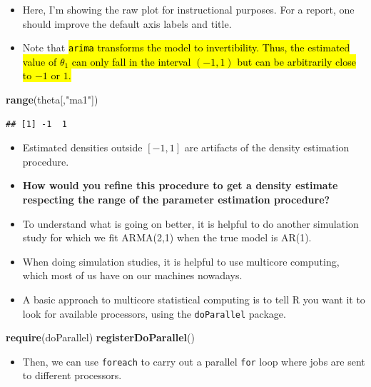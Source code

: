 \documentclass[]{article}
\newenvironment{Shaded}{\begin{snugshade}}{\end{snugshade}}
\newcommand{\KeywordTok}[1]{\textcolor[rgb]{0.13,0.29,0.53}{\textbf{#1}}}
\newcommand{\StringTok}[1]{\textcolor[rgb]{0.31,0.60,0.02}{#1}}
\newcommand{\NormalTok}[1]{#1}
\providecommand{\tightlist}{%
  \setlength{\itemsep}{0pt}\setlength{\parskip}{0pt}}
\begin{document}
\begin{itemize}
\item
  Here, I'm showing the raw plot for instructional purposes. For a
  report, one should improve the default axis labels and title.
\item
  Note that \hl{\texttt{arima} transforms the model to invertibility. Thus,
  the estimated value of $\theta_1$ can only fall in the interval
  $(-1,1)$ but can be arbitrarily close to $-1$ or $1$.}
\end{itemize}

\begin{Shaded}
\begin{Highlighting}[]
\KeywordTok{range}\NormalTok{(theta[,}\StringTok{"ma1"}\NormalTok{])}
\end{Highlighting}
\end{Shaded}

\begin{verbatim}
## [1] -1  1
\end{verbatim}

\begin{itemize}
\item Estimated densities outside $[-1,1]$ are artifacts of the density estimation procedure.
\item \textbf{How would you refine this procedure to get a density estimate respecting the range of the parameter estimation procedure? }
\item
  To understand what is going on better, it is helpful to do another
  simulation study for which we fit ARMA(2,1) when the true model is
  AR(1).
\item
  When doing simulation studies, it is helpful to use multicore
  computing, which most of us have on our machines nowadays.
\item
  A basic approach to multicore statistical computing is to tell R you
  want it to look for available processors, using the
  \texttt{doParallel} package.
\end{itemize}

\begin{Shaded}
\begin{Highlighting}[]
\KeywordTok{require}\NormalTok{(doParallel)}
\KeywordTok{registerDoParallel}\NormalTok{()}
\end{Highlighting}
\end{Shaded}

\begin{itemize}
\tightlist
\item
  Then, we can use \texttt{foreach} to carry out a parallel \texttt{for}
  loop where jobs are sent to different processors.
\end{itemize}
\end{document}

